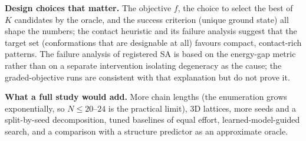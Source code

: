 \textbf{Design choices that matter.} The objective $f$, the choice to select the best of $K$ candidates by the oracle, and the success criterion (unique ground state) all shape the numbers; the contact heuristic and its failure analysis suggest that the target set (conformations that are designable at all) favours compact, contact-rich patterns. The failure analysis of registered SA is based on the energy-gap metric rather than on a separate intervention isolating degeneracy as the cause; the graded-objective runs are consistent with that explanation but do not prove it.

\textbf{What a full study would add.} More chain lengths (the enumeration grows exponentially, so $N\le 20$--$24$ is the practical limit), 3D lattices, more seeds and a split-by-seed decomposition, tuned baselines of equal effort, learned-model-guided search, and a comparison with a structure predictor as an approximate oracle.
